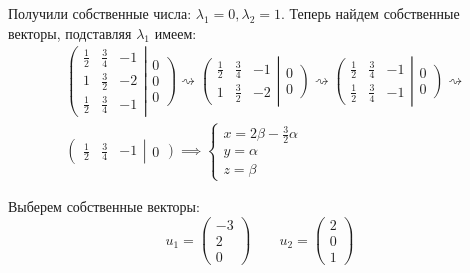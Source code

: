Получили собственные числа: \(λ_1 = 0, λ_2 = 1\). Теперь найдем
собственные векторы, подставляя \(\lambda_1\) имеем:\\
\begin{align*}
    &\left(
    \begin{matrix}
        \frac{1}{2} & \frac{3}{4} & -1 \\
        1 & \frac{3}{2} & -2 \\
        \frac{1}{2} & \frac{3}{4} & -1
    \end{matrix}
    \right|
    \left. \begin{matrix} 0 \\ 0 \\ 0 \end{matrix} \right)
    \rightsquigarrow
    \left(
    \begin{matrix}
        \frac{1}{2} & \frac{3}{4} & -1 \\
        1 & \frac{3}{2} & -2
    \end{matrix}
    \right|
    \left. \begin{matrix}  0 \\ 0 \end{matrix} \right)
    \rightsquigarrow
    \left(
    \begin{matrix}
        \frac{1}{2} & \frac{3}{4} & -1 \\
        \frac{1}{2} & \frac{3}{4} & -1
    \end{matrix}
    \right|
    \left. \begin{matrix}  0 \\ 0 \end{matrix} \right)
    \rightsquigarrow \\
    &
    \left(
    \begin{matrix} \frac{1}{2} & \frac{3}{4} & -1 \end{matrix}
    \right|
    \left. \begin{matrix}  0  \end{matrix} \right)
    \implies
    \begin{cases}
        x = 2β- \frac{3}{2}α \\
        y = α \\
        z = β
    \end{cases}
\end{align*}

Выберем собственные векторы:
\[
  u_1
  =
  \begin{pmatrix}
    -3 \\ 2 \\ 0
  \end{pmatrix}
  \qquad
  u_2
  =
  \begin{pmatrix}
    2 \\ 0 \\ 1
  \end{pmatrix}
\]

